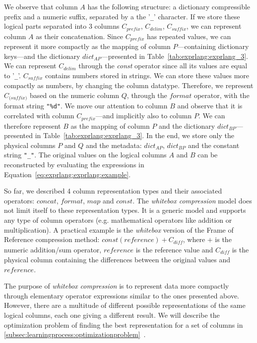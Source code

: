 We observe that column \(A\) has the following structure: a dictionary compressible prefix and a numeric suffix, separated by a the '\verb|_|' character. If we store these logical parts separated into 3 columns \(C_{\mathit{prefix}}\), \(C_{\mathit{delim}}\), \(C_{\mathit{suffix}}\), we can represent column \(A\) as their concatenation. Since \(C_{\mathit{prefix}}\) has repeated values, we can represent it more compactly as the mapping of column \(P\)---containing dictionary keys---and the dictionary \(dict_{AP}\)---presented in Table~\ref{tab:exprlang:exprlang_3}. We can represent \(C_{\mathit{delim}}\) through the \textit{const} operator since all its values are equal to '\verb|_|'. \(C_{\mathit{suffix}}\) contains numbers stored in strings. We can store these values more compactly as numbers, by changing the column datatype. Therefore, we represent \(C_{\mathit(suffix)}\) based on the numeric column \(Q\), through the \(format\) operator, with the format string \verb|"%d"|. We move our attention to column \(B\) and observe that it is correlated with column \(C_{\mathit{prefix}}\)---and implicitly also to column \(P\). We can therefore represent \(B\) as the mapping of column \(P\) and the dictionary \(dict_{BP}\)---presented in Table~\ref{tab:exprlang:exprlang_3}. In the end, we store only the physical columns \(P\) and \(Q\) and the metadata: \(dict_{AP}\), \(dict_{BP}\) and the constant string \verb|"_"|. The original values on the logical columns \(A\) and \(B\) can be reconstructed by evaluating the expressions in Equation~\ref{eq:exprlang:exprlang:example}.

So far, we described 4 column representation types and their associated operators: \(concat\), \(format\), \(map\) and \(const\). The \textit{whitebox compression} model does not limit itself to these representation types. It is a generic model and supports any type of column operators (e.g. mathematical operators like addition or multiplication). A practical example is the \textit{whitebox} version of the Frame of Reference compression method: \(const(\mathit{reference}) + C_{\mathit{diff}}\), where \(+\) is the numeric addition/sum operator, \(\mathit{reference}\) is the reference value and \(C_{\mathit{diff}}\) is the physical column containing the differences between the original values and \(\mathit{reference}\).

The purpose of \textit{whitebox compression} is to represent data more compactly through elementary operator expressions similar to the ones presented above. However, there are a multitude of different possible representations of the same logical columns, each one giving a different result. We will describe the optimization problem of finding the best representation for a set of columns in \ref{subsec:learningprocess:optimizationproblem}~.

